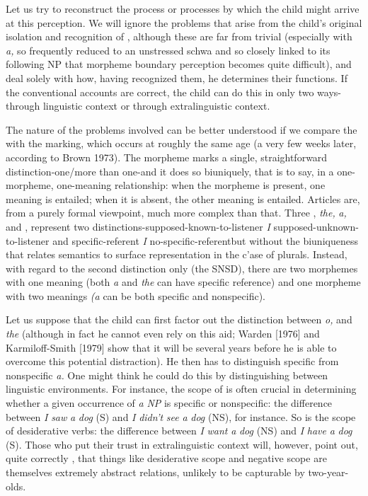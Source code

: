 Let us try to reconstruct the process or processes by which the child might arrive at this perception. We will ignore the problems that arise from the child's original isolation and recognition of , although these are far from trivial (especially with \textit{a,} so frequently reduced to an unstressed schwa and so closely linked to its following NP that morpheme boundary perception becomes quite difficult), and deal solely with how, having recognized them, he determines their functions. If the conventional accounts are correct, the child can do this in only two ways-through linguistic context or through extralinguistic context.

The nature of the problems involved can be better understood if we compare the   with the   marking, which occurs at roughly the same age (a very few weeks later, according to Brown 1973). The  morpheme marks a single, straightforward distinction-one/more than one-and it does so bi\-uniquely, that is to say, in a one-morpheme, one-meaning relationship: when the morpheme is present, one meaning is entailed; when it is absent, the other meaning is entailed. Articles are, from a purely formal viewpoint, much more complex than that. Three , \textit{the,} \textit{a,} and
\zero, represent two distinctions-supposed-known-to-listener \textit{I} sup\-posed-unknown-to-listener and specific-referent \textit{I} no-specific-referent\-but without the biuniqueness that relates semantics to surface repre\-sentation in the c'ase of plurals. Instead, with regard to the second distinction only (the SNSD), there are two morphemes with one meaning (both \textit{a} and \textit{the} can have specific reference) and one mor\-pheme with two meanings \textit{(}\textit{a} can be both specific and nonspecific).

Let us suppose that the child can first factor out the distinction between \textit{o,} and \textit{the} (although in fact he cannot even rely on this aid; Warden [1976] and Karmiloff-Smith [1979] show that it will be several years before he is able to overcome this potential distraction). He then has to distinguish specific from nonspecific \textit{a. }One might think he could do this by distinguishing between linguistic environ\-ments. For instance, the scope of  is often crucial in determin\-ing whether a given occurrence of \textit{a} \textit{NP} is specific or nonspecific: the difference between \textit{I} \textit{saw} \textit{a} \textit{dog} (S) and \textit{I} \textit{didn't} \textit{see} \textit{a} \textit{dog} (NS), for instance. So is the scope of desiderative verbs: the difference between \textit{I} \textit{want} \textit{a} \textit{dog} (NS) and \textit{I} \textit{have} \textit{a} \textit{dog} (S). Those who put their trust in extralinguistic context will, however, point out, quite correctly , that things like desiderative scope and negative scope are themselves ex\-tremely abstract relations, unlikely to be capturable by two-year-olds.

